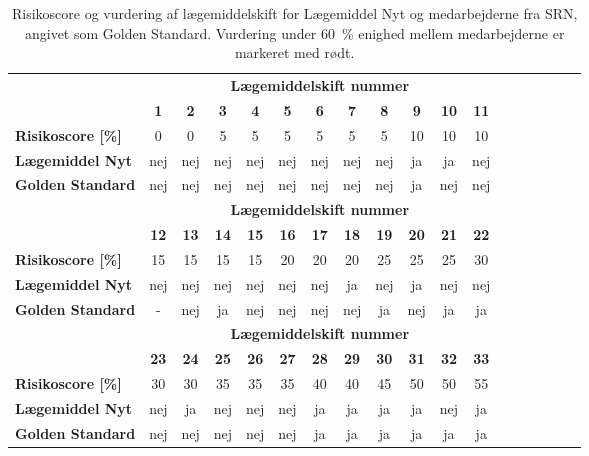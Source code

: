 \begin{table}[H]
\caption{Risikoscore og vurdering af lægemiddelskift for Lægemiddel Nyt og medarbejderne fra SRN, angivet som Golden Standard. Vurdering under 60~\% enighed mellem medarbejderne er markeret med rødt.}
\label{table:test2}
\centering
\begin{tabular}{l|c|c|c|c|c|c|c|c|c|c|c|c|c|c|c|c|c}
\rowcolor[HTML]{C0C0C0} \textbf{} & \multicolumn{11}{|c}{\textbf{Lægemiddelskift nummer}} \\
\rowcolor[HTML]{C0C0C0} & \textbf{1} & \textbf{2} & \textbf{3} & \textbf{4} & \textbf{5} & \textbf{6} & \textbf{7} &  \textbf{8} & \textbf{9} & \textbf{10} & \textbf{11}   \\ \hline
\textbf{Risikoscore [\%]} & 0  & 0 & 5 & 5 & 5 & 5 & 5 & 5 & 10 & 10 & 10  \\ \hline
\textbf{Lægemiddel Nyt} & nej & nej & nej & nej & nej & nej & nej & nej & ja & ja & nej \\ \hline
\textbf{Golden Standard} & nej & nej & nej& nej & nej &nej & nej & nej& ja & nej & nej \\ \hline
\rowcolor[HTML]{C0C0C0} & \multicolumn{11}{|c}{\textbf{Lægemiddelskift nummer}} \\
\rowcolor[HTML]{C0C0C0} & \textbf{12} & \textbf{13} & \textbf{14} &  \textbf{15} & \textbf{16} & \textbf{17} & \textbf{18} & \textbf{19} & \textbf{20} & \textbf{21} & \textbf{22}  \\ \hline
\textbf{Risikoscore [\%]} & \cellcolor[HTML]{F6E6E5} 15 & 15 & 15 & 15 & 20 & 20 & 20 & 25 & 25 & 25 & 30 \\ \hline
\textbf{Lægemiddel Nyt} & \cellcolor[HTML]{F6E6E5}nej & nej & nej & nej & nej & nej & ja & nej & ja & nej & nej\\ \hline
\textbf{Golden Standard} & \cellcolor[HTML]{F6E6E5} - & nej & ja & nej & nej & nej & nej & ja & nej & ja & ja \\ \hline
\rowcolor[HTML]{C0C0C0} & \multicolumn{11}{|c}{\textbf{Lægemiddelskift nummer}} \\ 
\rowcolor[HTML]{C0C0C0} & \textbf{23} & \textbf{24} & \textbf{25} & \textbf{26} & \textbf{27} & \textbf{28} &  \textbf{29} & \textbf{30} & \textbf{31} & \textbf{32} & \textbf{33}  \\ \cline{1-10}
\textbf{Risikoscore [\%]} & 30 & 30 & 35 & 35 & 35 & 40 & 40 & 45 & 50 & 50 & 55 \\ \hline 
\textbf{Lægemiddel Nyt} & nej & ja & nej & nej & nej & ja & ja & ja & ja & nej & ja\\ \hline
\textbf{Golden Standard} & nej & nej & nej & nej & nej & ja & ja& ja & ja&ja & ja \\\hline
\end{tabular}
\end{table}

